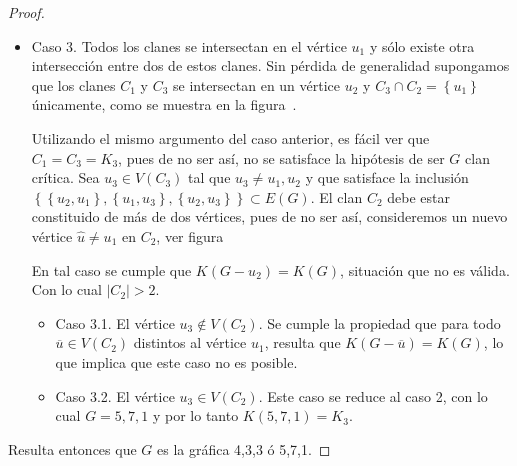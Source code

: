 \documentclass[12pt]{book}
\theoremstyle{definition}
\begin{document}
\begin{proof}
\begin{itemize}
\item Caso 3.
Todos los clanes se intersectan en el vértice $u_1$ y sólo existe otra intersección entre dos de estos clanes. Sin pérdida de generalidad supongamos que los clanes $C_1$ y $C_3$ se intersectan en un vértice $u_2$ y $C_3\cap C_2=\left\{u_1\right\}$ únicamente, como se muestra en la figura~.





Utilizando el mismo argumento del caso anterior, es fácil ver que $C_1= C_3=K_3$, pues de no ser así, no se satisface la hipótesis de ser $G$ clan crítica. Sea $u_3\in V(C_3)$ tal que $u_3\neq u_1,u_2$ y que satisface la inclusión $\left\{\left\{u_2,u_1\right\},\left\{u_1,u_3\right\},\left\{u_2,u_3\right\}\right\}\subset E(G)$. El clan $C_2$ debe estar constituido de más de dos vértices, pues de no ser así, consideremos un nuevo vértice $\hat{u}\neq u_1$ en $C_2$, ver figura~




En tal caso se cumple que $K(G-u_2)=K(G)$, situación que no es válida. Con lo cual $|C_2|>2$.
\begin{itemize}
\item Caso 3.1.
El vértice $u_3\notin V(C_2)$. Se cumple la propiedad que para todo $\overline{u}\in V(C_2)$ distintos al vértice $u_1$, resulta que $K(G-\overline{u})=K(G)$, lo que implica que este caso no es posible.

\item Caso 3.2.
El vértice $u_3\in V(C_2)$. Este caso se reduce al caso 2, con lo cual $G=5,7,1$ y por lo tanto $K(5,7,1)=K_3$.
\end{itemize}
\end{itemize}
Resulta entonces que $G$ es la gráfica 4,3,3 ó 5,7,1.
\end{proof}







\end{document}

